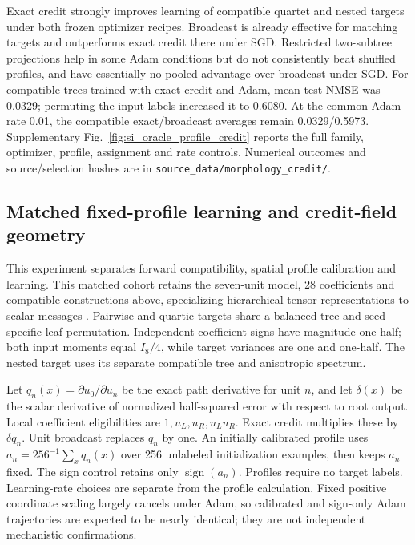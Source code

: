 Exact credit strongly improves learning of compatible quartet and nested targets under both frozen optimizer recipes. Broadcast is already effective for matching targets and outperforms exact credit there under SGD. Restricted two-subtree projections help in some Adam conditions but do not consistently beat shuffled profiles, and have essentially no pooled advantage over broadcast under SGD. For compatible trees trained with exact credit and Adam, mean test NMSE was 0.0329; permuting the input labels increased it to 0.6080. At the common Adam rate 0.01, the compatible exact/broadcast averages remain 0.0329/0.5973. Supplementary Fig.~\ref{fig:si_oracle_profile_credit} reports the full family, optimizer, profile, assignment and rate controls. Numerical outcomes and source/selection hashes are in \texttt{source\_data/morphology\_credit/}.
\subsection{Matched fixed-profile learning and credit-field geometry}

This experiment separates forward compatibility, spatial profile calibration and learning. This matched cohort retains the seven-unit model, 28 coefficients and compatible constructions above, specializing hierarchical tensor representations to scalar messages \citep{hackbusch2009tensor,grasedyck2010hierarchical}. Pairwise and quartic targets share a balanced tree and seed-specific leaf permutation. Independent coefficient signs have magnitude one-half; both input moments equal $I_8/4$, while target variances are one and one-half. The nested target uses its separate compatible tree and anisotropic spectrum.

Let $q_n(x)=\partial u_0/\partial u_n$ be the exact path derivative for unit $n$, and let $\delta(x)$ be the scalar derivative of normalized half-squared error with respect to root output. Local coefficient eligibilities are $1,u_L,u_R,u_Lu_R$. Exact credit multiplies these by $\delta q_n$. Unit broadcast replaces $q_n$ by one. An initially calibrated profile uses $a_n=256^{-1}\sum_x q_n(x)$ over 256 unlabeled initialization examples, then keeps $a_n$ fixed. The sign control retains only $\operatorname{sign}(a_n)$. Profiles require no target labels. Learning-rate choices are separate from the profile calculation. Fixed positive coordinate scaling largely cancels under Adam, so calibrated and sign-only Adam trajectories are expected to be nearly identical; they are not independent mechanistic confirmations.

